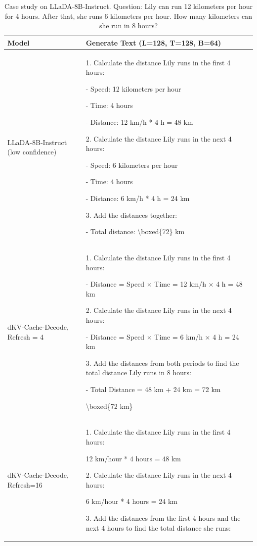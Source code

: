 \documentclass{article}
\newcommand{\dmethodname}{dKV-Cache-Decode}
\begin{document}
\begin{table}[t]
    \centering
    \caption{Case study on LLaDA-8B-Instruct. Question: Lily can run 12 kilometers per hour for 4 hours. After that, she runs 6 kilometers per hour. How many kilometers can she run in 8 hours?} \label{tbl:case_study_llada}
    \begin{tabular}{p{2cm}|p{10cm}}
    \toprule
    Model & Generate Text (L=128, T=128, B=64)\\
    \midrule
        LLaDA-8B-Instruct (low confidence) & 1. Calculate the distance Lily runs in the first 4 hours:
        
   - Speed: 12 kilometers per hour
   
   - Time: 4 hours
   
   - Distance: 12 km/h * 4 h = 48 km

2. Calculate the distance Lily runs in the next 4 hours:

   - Speed: 6 kilometers per hour
   
   - Time: 4 hours
   
   - Distance: 6 km/h * 4 h = 24 km

3. Add the distances together:

   - Total distance: \textbackslash boxed\{72\} km \\ 

    \midrule
    \dmethodname, Refresh = 4 & 1. Calculate the distance Lily runs in the first 4 hours:
    
   - Distance = Speed × Time = 12 km/h × 4 h = 48 km

2. Calculate the distance Lily runs in the next 4 hours:

   - Distance = Speed × Time = 6 km/h × 4 h = 24 km

3. Add the distances from both periods to find the total distance Lily runs in 8 hours:

   - Total Distance = 48 km + 24 km = 72 km

\textbackslash boxed\{72 km\} \\
    \midrule
   \dmethodname, Refresh=16 & 1. Calculate the distance Lily runs in the first 4 hours: 
   
   12 km/hour * 4 hours = 48 km

2. Calculate the distance Lily runs in the next 4 hours: 

   6 km/hour * 4 hours = 24 km

3. Add the distances from the first 4 hours and the next 4 hours to find the total distance she runs: 


\end{tabular}
\end{table}
\end{document}
